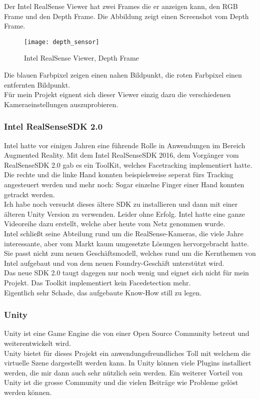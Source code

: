 Der Intel RealSense Viewer hat zwei Frames die er anzeigen kann, den RGB Frame und den Depth Frame. Die Abbildung zeigt einen Screenshot vom Depth Frame.

\begin{figure}[H]
\texttt{[image: depth\_sensor]}
\caption{Intel RealSense Viewer, Depth Frame}
\label{fig:RealSense Viewer}
\end{figure}
		
Die blauen Farbpixel zeigen einen nahen Bildpunkt, die roten Farbpixel einen entfernten Bildpunkt. \\ Für mein Projekt eignent sich dieser Viewer einzig dazu die verschiedenen Kameraeinstellungen auszuprobieren.
			
\subsubsection{Intel RealSenseSDK 2.0}

Intel hatte vor einigen Jahren eine führende Rolle in Anwendungen im Bereich Augmented Reality. Mit dem Intel RealSenseSDK 2016, dem Vorgänger vom RealSenseSDK 2.0 gab es ein ToolKit, welches Facetracking implementiert hatte. Die rechte und die linke Hand konnten beispielsweise seperat fürs Tracking angesteuert werden und mehr noch: Sogar einzelne Finger einer Hand konnten getrackt werden. \\ Ich habe noch versucht dieses ältere SDK zu installieren und dann mit einer älteren Unity Version zu verwenden. Leider ohne Erfolg. Intel hatte eine ganze Videoreihe dazu erstellt, welche aber heute vom Netz genommen wurde.\\
Intel schließt seine Abteilung rund um die RealSense-Kameras, die viele Jahre interessante, aber vom Markt kaum umgesetzte Lösungen hervorgebracht hatte. Sie passt nicht zum neuen Geschäftsmodell, welches rund um die Kernthemen von Intel aufgebaut und von dem neuen Foundry-Geschäft unterstützt wird.
\cite{ComputerBase} \\ Das neue SDK 2.0 taugt dagegen nur noch wenig und eignet sich nicht für mein Projekt. Das Toolkit implementiert kein Facedetection mehr. \\ Eigentlich sehr Schade, das aufgebaute Know-How still zu legen.

\subsubsection{Unity}

Unity ist eine Game Engine die von einer Open Source Community betreut und weiterentwickelt wird. \cite{Unity} \\ Unity bietet für dieses Projekt ein anwendungsfreundliches Toll mit welchem die virtuelle Szene dargestellt werden kann. In Unity können viele Plugins installiert werden, die mir dann auch sehr nützlich sein werden. Ein weiterer Vorteil von Unity ist die grosse Community und die vielen Beiträge wie Probleme gelöst werden können. 

